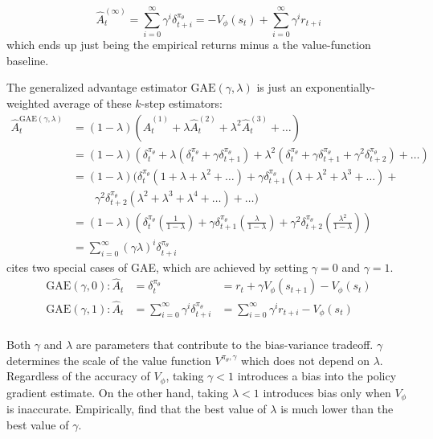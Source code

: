 \documentclass[journal, onecolumn, 12pt, draftclsnofoot]{IEEEtran}
\begin{document}
		\begin{equation}
			\hat{A}_t^{(\infty)} = \sum_{i=0}^\infty \gamma^i \delta_{t+i}^{\pi_\theta} = -V_\phi(s_t) + \sum_{i=0}^\infty \gamma^i r_{t+i}
		\end{equation}
		which ends up just being the empirical returns minus a the value-function baseline.
		\par The generalized advantage estimator $\text{GAE}(\gamma, \lambda)$ is just an exponentially-weighted average of these $k$-step estimators:
		\begin{align*}
			\hat{A}_t^{\text{GAE}(\gamma, \lambda)} &= (1-\lambda)\left(\hat{A}_t^{(1)} + \lambda \hat{A}_t^{(2)} +  \lambda^2 \hat{A}_t^{(3)} + \dots \right) \\
			&= (1-\lambda)\left(\delta_{t}^{\pi_\theta} + \lambda (\delta_{t}^{\pi_\theta} + \gamma \delta_{t+1}^{\pi_\theta}) +  \lambda^2 (\delta_{t}^{\pi_\theta} + \gamma \delta_{t+1}^{\pi_\theta} + \gamma^2 \delta_{t+2}^{\pi_\theta}) + \dots \right) \\
			&= (1-\lambda) (\delta_{t}^{\pi_\theta}(1 + \lambda + \lambda^2 + \dots) + \gamma \delta_{t+1}^{\pi_\theta}(\lambda + \lambda^2 + \lambda^3 + \dots) + \\ & \quad \quad  \gamma^2\delta_{t+2}^{\pi_\theta}(\lambda^2 + \lambda^3 + \lambda^4 + \dots) + \dots ) \\
			&= (1-\lambda) \left(\delta_{t}^{\pi_\theta}\left(\frac{1}{1-\lambda}\right) + \gamma \delta_{t+1}^{\pi_\theta}\left(\frac{\lambda}{1-\lambda}\right) + \gamma^2 \delta_{t+2}^{\pi_\theta}\left(\frac{\lambda^2}{1-\lambda}\right) \right) \\
			&= \sum_{i=0}^\infty (\gamma \lambda)^i \delta_{t+i}^{\pi_\theta}
		\end{align*}
		\cite{gae} cites two special cases of GAE, which are achieved by setting $\gamma = 0$ and $\gamma=1$.
		\begin{align*}
			\text{GAE}(\gamma, 0): \hat{A}_t &= \delta_{t}^{\pi_\theta} &= r_t + \gamma V_\phi(s_{t+1}) - V_\phi(s_{t}) \\
			\text{GAE}(\gamma, 1): \hat{A}_t &= \sum_{i=0}^\infty \gamma^i \delta_{t+i}^{\pi_\theta} &= \sum_{i=0}^\infty \gamma^i r_{t+i} - V_\phi(s_{t}) \\
		\end{align*}
		\par Both $\gamma$ and $\lambda$ are parameters that contribute to the bias-variance tradeoff. $\gamma$ determines the scale of the value function $V^{\pi_\theta, \gamma}$ which does not depend on $\lambda$. Regardless of the accuracy of $V_\phi$, taking $\gamma < 1$ introduces a bias into the policy gradient estimate. On the other hand, taking $\lambda < 1$ introduces bias only when $V_\phi$ is inaccurate. Empirically, \cite{gae} find that the best value of $\lambda$ is much lower than the best value of $\gamma$.
\end{document}
